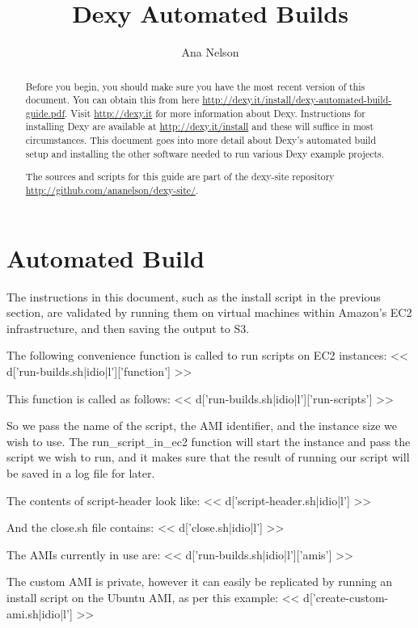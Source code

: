 \documentclass{tufte-handout}
\title{Dexy Automated Builds}
\author{Ana Nelson}
\begin{document}
\maketitle

\begin{abstract}
Before you begin, you should make sure you have the most recent version of this document. You can obtain this from here \url{http://dexy.it/install/dexy-automated-build-guide.pdf}. Visit \url{http://dexy.it} for more information about Dexy. Instructions for installing Dexy are available at \url{http://dexy.it/install} and these will suffice in most circumstances. This document goes into more detail about Dexy's automated build setup and installing the other software needed to run various Dexy example projects.

The sources and scripts for this guide are part of the dexy-site repository \url{http://github.com/ananelson/dexy-site/}.

\end{abstract}

\section{Automated Build}

The instructions in this document, such as the install script in the previous section, are validated by running them on virtual machines within Amazon's EC2 infrastructure, and then saving the output to S3.

\noindent The following convenience function is called to run scripts on EC2 instances:
<< d['run-builds.sh|idio|l']['function'] >>

\noindent This function is called as follows:
<< d['run-builds.sh|idio|l']['run-scripts'] >>

So we pass the name of the script, the AMI identifier, and the instance size we wish to use. The run\_script\_in\_ec2 function will start the instance and pass the script we wish to run, and it makes sure that the result of running our script will be saved in a log file for later.

The contents of script-header look like:
<< d['script-header.sh|idio|l'] >>

And the close.sh file contains:
<< d['close.sh|idio|l'] >>

The AMIs currently in use are:
<< d['run-builds.sh|idio|l']['amis'] >>

The custom AMI is private, however it can easily be replicated by running an install script on the Ubuntu AMI, as per this example:
<< d['create-custom-ami.sh|idio|l'] >>
\end{document}
